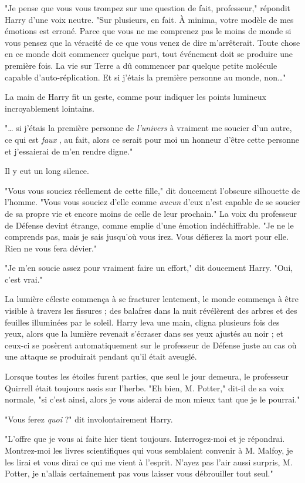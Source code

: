 "Je pense que vous vous trompez sur une question de fait, professeur," répondit Harry d'une voix neutre. "Sur plusieurs, en fait. À minima, votre modèle de mes émotions est erroné. Parce que vous ne me comprenez pas le moins de monde si vous pensez que la véracité de ce que vous venez de dire m'arrêterait. Toute chose en ce monde doit commencer quelque part, tout événement doit se produire une première fois. La vie sur Terre a dû commencer par quelque petite molécule capable d'auto-réplication. Et si j'étais la première personne au monde, non…"

La main de Harry fit un geste, comme pour indiquer les points lumineux incroyablement lointains.

"… si j'étais la première personne de \emph{l'univers}  à vraiment me soucier d'un autre, ce qui est \emph{faux} , au fait, alors ce serait pour moi un honneur d'être cette personne et j'essaierai de m'en rendre digne."

Il y eut un long silence.

"Vous vous souciez réellement de cette fille," dit doucement l'obscure silhouette de l'homme. "Vous vous souciez d'elle comme \emph{aucun}  d'eux n'est capable de se soucier de sa propre vie et encore moins de celle de leur prochain." La voix du professeur de Défense devint étrange, comme emplie d'une émotion indéchiffrable. "Je ne le comprends pas, mais je sais jusqu'où vous irez. Vous défierez la mort pour elle. Rien ne vous fera dévier."

"Je m'en soucie assez pour vraiment faire un effort," dit doucement Harry. "Oui, c'est vrai."

La lumière céleste commença à se fracturer lentement, le monde commença à être visible à travers les fissures ; des balafres dans la nuit révélèrent des arbres et des feuilles illuminées par le soleil. Harry leva une main, cligna plusieurs fois des yeux, alors que la lumière revenait s'écraser dans ses yeux ajustés au noir ; et ceux-ci se posèrent automatiquement sur le professeur de Défense juste au cas où une attaque se produirait pendant qu'il était aveuglé.

Lorsque toutes les étoiles furent parties, que seul le jour demeura, le professeur Quirrell était toujours assis sur l'herbe. "Eh bien, M. Potter," dit-il de sa voix normale, "si c'est ainsi, alors je vous aiderai de mon mieux tant que je le pourrai."

"Vous ferez \emph{quoi}  ?" dit involontairement Harry.

"L'offre que je vous ai faite hier tient toujours. Interrogez-moi et je répondrai. Montrez-moi les livres scientifiques qui vous semblaient convenir à M. Malfoy, je les lirai et vous dirai ce qui me vient à l'esprit. N'ayez pas l'air aussi surpris, M. Potter, je n'allais certainement pas vous laisser vous débrouiller tout seul."

